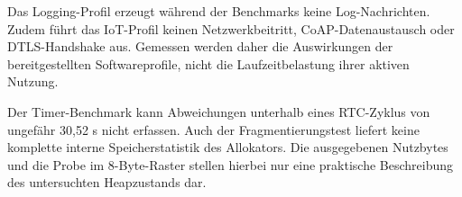 Das Logging-Profil erzeugt w{\"a}hrend der Benchmarks keine Log-Nachrichten. Zudem f{\"u}hrt das IoT-Profil keinen Netzwerkbeitritt, CoAP-Datenaustausch oder DTLS-Handshake aus. Gemessen werden daher die Auswirkungen der bereitgestellten Softwareprofile, nicht die Laufzeitbelastung ihrer aktiven Nutzung.

Der Timer-Benchmark kann Abweichungen unterhalb eines RTC-Zyklus von ungef{\"a}hr 30,52 \textmu{}s nicht erfassen. Auch der Fragmentierungstest liefert keine komplette interne Speicherstatistik des Allokators. Die ausgegebenen Nutzbytes und die Probe im 8-Byte-Raster stellen hierbei nur eine praktische Beschreibung des untersuchten Heapzustands dar.
